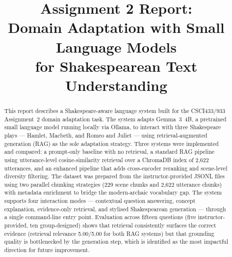 \documentclass[10pt,conference]{IEEEtran}
\title{
Assignment 2 Report:\\
Domain Adaptation with Small Language Models\\
for Shakespearean Text Understanding
}
\author{
\IEEEauthorblockN{
Group Number: \emph{[Insert Group Number]}
}
\IEEEauthorblockA{
CSCI433/933 Machine Learning Algorithms and Applications\\
Student Names and Student Numbers: \emph{[Insert Details]}
}
}
\begin{document}
\maketitle

\begin{center}
\end{center}

\begin{abstract}
This report describes a Shakespeare-aware language system built for
the CSCI433/933 Assignment~2 domain adaptation task. The system
adapts Gemma~3~4B, a pretrained small language model running locally
via Ollama, to interact with three Shakespeare plays --- Hamlet,
Macbeth, and Romeo and Juliet --- using retrieval-augmented
generation (RAG) as the sole adaptation strategy. Three systems were
implemented and compared: a prompt-only baseline with no retrieval,
a standard RAG pipeline using utterance-level cosine-similarity
retrieval over a ChromaDB index of 2{,}622 utterances, and an enhanced
pipeline that adds cross-encoder reranking and scene-level diversity
filtering. The dataset was prepared from the instructor-provided
JSONL files using two parallel chunking strategies (229 scene chunks
and 2{,}622 utterance chunks) with metadata enrichment to bridge the
modern-archaic vocabulary gap. The system supports four interaction
modes --- contextual question answering, concept explanation,
evidence-only retrieval, and stylised Shakespearean generation ---
through a single command-line entry point. Evaluation across
fifteen questions (five instructor-provided, ten group-designed)
shows that retrieval consistently surfaces the correct evidence
(retrieval relevance 5.00/5.00 for both RAG systems) but that
grounding quality is bottlenecked by the generation step, which is
identified as the most impactful direction for future improvement.
\end{abstract}
\end{document}
